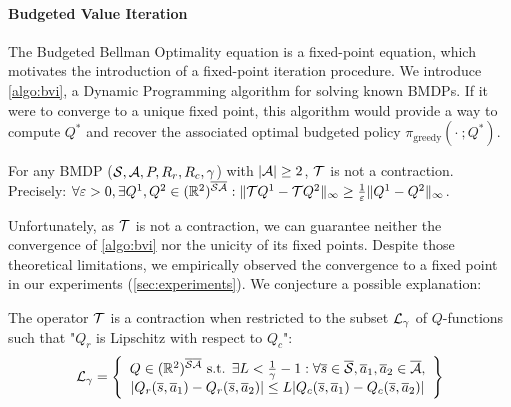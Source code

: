 \paragraph{Budgeted Value Iteration}

The Budgeted Bellman Optimality equation is a fixed-point equation, which motivates the introduction of a fixed-point iteration procedure. We introduce \autoref{algo:bvi}, a Dynamic Programming algorithm for solving known BMDPs. If it were to converge to a unique fixed point, this algorithm would provide a way to compute $Q^*$ and recover the associated optimal budgeted policy $\pi_\text{greedy}(\cdot~; Q^*)$.

\begin{theorem}
	\begin{leftbar}[theorembar]
	\label{thm:contraction}
	For any BMDP ($\mathcal{S},\mathcal{A},P,R_r,R_c,\gamma$) with $|\mathcal{A}| \geq 2$, $\mathcal{T}$ is not a contraction. Precisely: $\forall\varepsilon>0, \exists Q^1,Q^2\in(\mathbb{R}^2)^{\overline{\mathcal{S}}\overline{\mathcal{A}}}:\|\mathcal{T} Q^1-\mathcal{T} Q^2\|_\infty \geq \frac{1}{\varepsilon}\|Q^1-Q^2\|_\infty$.
	\end{leftbar}
\end{theorem}

Unfortunately, as $\mathcal{T}$ is not a contraction, we can guarantee neither the convergence of \autoref{algo:bvi} nor the unicity of its fixed points. Despite those theoretical limitations, we empirically observed the convergence to a fixed point in our experiments (\autoref{sec:experiments}). We conjecture a possible explanation:

\begin{theorem}
	\begin{leftbar}[theorembar]
	\label{rmk:contractivity-smooth}
	The operator $\mathcal{T}$ is a contraction when restricted to the subset $\mathcal{L}_\gamma$ of $Q$-functions such that "$Q_r$ is Lipschitz with respect to $Q_c$":
	\begin{equation}
	\mathcal{L}_\gamma = \left\{\begin{array}{cc}
	Q\in(\mathbb{R}^2)^{\overline{\mathcal{S}}\overline{\mathcal{A}}}\text{ s.t. }\exists L<\frac{1}{\gamma}-1: \forall \overline{s}\in\overline{\mathcal{S}},\overline{a}_1,\overline{a}_2\in\overline{\mathcal{A}},   \\
	|Q_r(\overline{s},\overline{a}_1) - Q_r(\overline{s},\overline{a}_2)| \leq L|Q_c(\overline{s},\overline{a}_1) - Q_c(\overline{s},\overline{a}_2)|
	\end{array}\right\}
	\end{equation}
	\end{leftbar}
\end{theorem}

